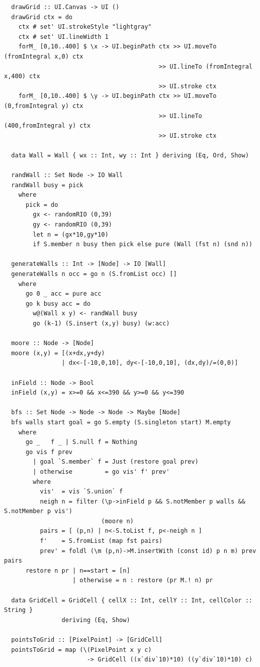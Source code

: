 \documentclass[areasetadvanced]{scrartcl}
\begin{document}
\begin{lstlisting}
  drawGrid :: UI.Canvas -> UI ()
  drawGrid ctx = do
    ctx # set' UI.strokeStyle "lightgray"
    ctx # set' UI.lineWidth 1
    forM_ [0,10..400] $ \x -> UI.beginPath ctx >> UI.moveTo (fromIntegral x,0) ctx
                                           >> UI.lineTo (fromIntegral x,400) ctx
                                           >> UI.stroke ctx
    forM_ [0,10..400] $ \y -> UI.beginPath ctx >> UI.moveTo (0,fromIntegral y) ctx
                                           >> UI.lineTo (400,fromIntegral y) ctx
                                           >> UI.stroke ctx
  
  data Wall = Wall { wx :: Int, wy :: Int } deriving (Eq, Ord, Show)
  
  randWall :: Set Node -> IO Wall
  randWall busy = pick
    where
      pick = do
        gx <- randomRIO (0,39)
        gy <- randomRIO (0,39)
        let n = (gx*10,gy*10)
        if S.member n busy then pick else pure (Wall (fst n) (snd n))
  
  generateWalls :: Int -> [Node] -> IO [Wall]
  generateWalls n occ = go n (S.fromList occ) []
    where
      go 0 _ acc = pure acc
      go k busy acc = do
        w@(Wall x y) <- randWall busy
        go (k-1) (S.insert (x,y) busy) (w:acc)
  
  moore :: Node -> [Node]
  moore (x,y) = [(x+dx,y+dy)
                | dx<-[-10,0,10], dy<-[-10,0,10], (dx,dy)/=(0,0)]
  
  inField :: Node -> Bool
  inField (x,y) = x>=0 && x<=390 && y>=0 && y<=390
  
  bfs :: Set Node -> Node -> Node -> Maybe [Node]
  bfs walls start goal = go S.empty (S.singleton start) M.empty
    where
      go _   f _ | S.null f = Nothing
      go vis f prev
        | goal `S.member` f = Just (restore goal prev)
        | otherwise         = go vis' f' prev'
        where
          vis'  = vis `S.union` f
          neigh n = filter (\p->inField p && S.notMember p walls && S.notMember p vis')
                           (moore n)
          pairs = [ (p,n) | n<-S.toList f, p<-neigh n ]
          f'    = S.fromList (map fst pairs)
          prev' = foldl (\m (p,n)->M.insertWith (const id) p n m) prev pairs
      restore n pr | n==start = [n]
                   | otherwise = n : restore (pr M.! n) pr
  
  data GridCell = GridCell { cellX :: Int, cellY :: Int, cellColor :: String }
                deriving (Eq, Show)
  
  pointsToGrid :: [PixelPoint] -> [GridCell]
  pointsToGrid = map (\(PixelPoint x y c)
                       -> GridCell ((x`div`10)*10) ((y`div`10)*10) c)
  

\end{lstlisting}
\end{document}
